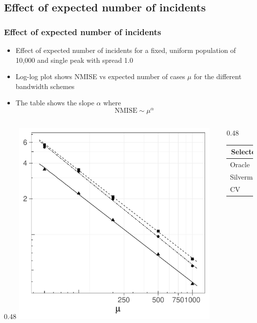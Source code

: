 \documentclass[notheorems]{beamer}
\theoremstyle{definition}
\theoremstyle{example}
\begin{document}
\subsection{Effect of expected number of incidents}
\begin{frame}\frametitle{Effect of expected number of incidents}
    \scriptsize
    \begin{itemize}
        \item Effect of expected number of incidents for a fixed, uniform population of 10,000 and single peak with spread 1.0
        \item Log-log plot shows NMISE vs expected number of cases $\mu$ for the different bandwidth schemes
        \item The table shows the slope $\alpha$ where
            $$
                \mbox{NMISE} \sim \mu^{\alpha}
            $$
    \end{itemize}
    \begin{columns}
        \begin{column}{0.48\textwidth}
            \includegraphics[width=0.9\textwidth]{results/by_num_cases/NMISE-vs-cases-log-log}
        \end{column}
        \begin{column}{0.48\textwidth}
            \begin{tabular}{lr}
                \toprule
                \multicolumn{1}{c}{Selector}&\multicolumn{1}{c}{Slope}\tabularnewline
                \midrule
                Oracle&$-0.742$\tabularnewline
                Silverman&$-0.741$\tabularnewline
                CV&$-0.775$\tabularnewline
                \bottomrule
            \end{tabular}
        \end{column}
    \end{columns}
\end{frame}
\end{document}
